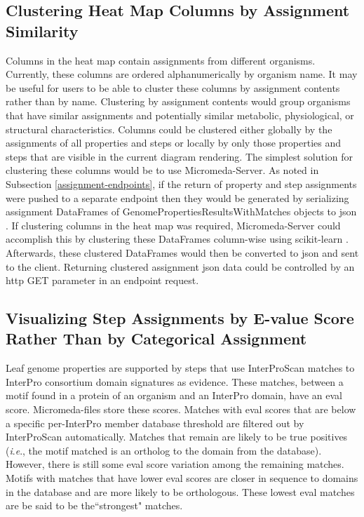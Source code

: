 \subsection{Clustering Heat Map Columns by Assignment Similarity}

Columns in the heat map contain assignments from different organisms. Currently, 
these columns are ordered alphanumerically by organism name. It may be useful 
for users to be able to cluster these columns by assignment contents rather than 
by name. Clustering by assignment contents would group organisms that have 
similar assignments and potentially similar metabolic, physiological, or 
structural characteristics. Columns could be clustered either globally by the 
assignments of all properties and steps or locally by only those properties and 
steps that are visible in the current diagram rendering. The simplest solution 
for clustering these columns would be to use Micromeda-Server. As noted in 
Subsection \ref{assignment-endpoints}, if the return of property and step 
assignments were pushed to a separate endpoint then they would be generated by 
serializing assignment DataFrames of GenomePropertiesResultsWithMatches objects 
to \gls{json} \cite{bray2014rfc}. If clustering columns in the heat map was 
required, Micromeda-Server could accomplish this by clustering these DataFrames 
column-wise using \gls{scikit}-learn \cite{pedregosa2011scikit}. Afterwards, these 
clustered DataFrames would then be converted to \gls{json} and sent to the 
client. Returning clustered assignment \gls{json} data could be controlled by an 
\gls{http} GET parameter in an endpoint request.

\subsection{Visualizing Step Assignments by E-value Score Rather Than by 
Categorical Assignment} \label{interface-e-value}

Leaf genome properties are supported by steps that use InterProScan matches to 
InterPro consortium domain signatures as evidence. These matches, between a 
motif found in a protein of an organism and an InterPro domain, have an 
\gls{eval} score. Micromeda-files store these scores. Matches with \gls{eval} 
scores that are below a specific per-InterPro member database threshold are 
filtered out by InterProScan automatically. Matches that remain are likely to be 
true positives (\textit{i}.\textit{e}., the motif matched is an ortholog to the domain from the 
database). However, there is still some \gls{eval} score variation among the 
remaining matches. Motifs with matches that have lower \gls{eval} scores are 
closer in sequence to domains in the database and are more likely to be 
orthologous. These lowest \gls{eval} matches are be said to be the``strongest" 
matches.

